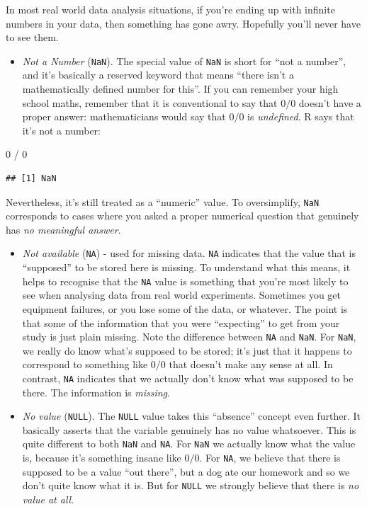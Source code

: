\documentclass[
]{book}
\newenvironment{Shaded}{\begin{snugshade}}{\end{snugshade}}
\newcommand{\DecValTok}[1]{\textcolor[rgb]{0.00,0.00,0.81}{#1}}
\newcommand{\SpecialCharTok}[1]{\textcolor[rgb]{0.00,0.00,0.00}{#1}}
\providecommand{\tightlist}{%
  \setlength{\itemsep}{0pt}\setlength{\parskip}{0pt}}
\begin{document}
In most real world data analysis situations, if you're ending up with infinite numbers in your data, then something has gone awry. Hopefully you'll never have to see them.

\begin{itemize}
\tightlist
\item
  \emph{Not a Number} (\texttt{NaN}). The special value of \texttt{NaN} is short for ``not a number'', and it's basically a reserved keyword that means ``there isn't a mathematically defined number for this''. If you can remember your high school maths, remember that it is conventional to say that \(0/0\) doesn't have a proper answer: mathematicians would say that \(0/0\) is \emph{undefined}. R says that it's not a number:
\end{itemize}

\begin{Shaded}
\begin{Highlighting}[]
 \DecValTok{0} \SpecialCharTok{/} \DecValTok{0}
\end{Highlighting}
\end{Shaded}

\begin{verbatim}
## [1] NaN
\end{verbatim}

Nevertheless, it's still treated as a ``numeric'' value. To oversimplify, \texttt{NaN} corresponds to cases where you asked a proper numerical question that genuinely has \emph{no meaningful answer}.

\begin{itemize}
\item
  \emph{Not available} (\texttt{NA}) - used for missing data.
  \texttt{NA} indicates that the value that is ``supposed'' to be stored here is missing. To understand what this means, it helps to recognise that the \texttt{NA} value is something that you're most likely to see when analysing data from real world experiments. Sometimes you get equipment failures, or you lose some of the data, or whatever. The point is that some of the information that you were ``expecting'' to get from your study is just plain missing. Note the difference between \texttt{NA} and \texttt{NaN}. For \texttt{NaN}, we really do know what's supposed to be stored; it's just that it happens to correspond to something like \(0/0\) that doesn't make any sense at all. In contrast, \texttt{NA} indicates that we actually don't know what was supposed to be there. The information is \emph{missing}.
\item
  \emph{No value} (\texttt{NULL}).
  The \texttt{NULL} value takes this ``absence'' concept even further. It basically asserts that the variable genuinely has no value whatsoever. This is quite different to both \texttt{NaN} and \texttt{NA}. For \texttt{NaN} we actually know what the value is, because it's something insane like \(0/0\). For \texttt{NA}, we believe that there is supposed to be a value ``out there'', but a dog ate our homework and so we don't quite know what it is. But for \texttt{NULL} we strongly believe that there is \emph{no value at all}.
\end{itemize}
\end{document}
